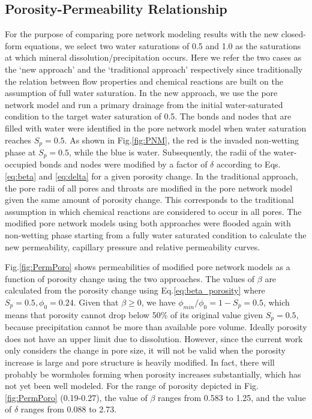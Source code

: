 \documentclass[preprint,12pt,authoryear]{elsarticle}
\begin{document}
\subsection{Porosity-Permeability Relationship}
For the purpose of comparing pore network modeling results with the new closed-form equations, we select two water saturations of 0.5 and 1.0 as the saturations at which mineral dissolution/precipitation occurs. Here we refer the two cases as the `new approach' and the `traditional approach' respectively since traditionally the relation between flow properties and chemical reactions are built on the assumption of full water saturation. In the new approach, we use the pore network model and run a primary drainage from the initial water-saturated condition to the target water saturation of 0.5. The bonds and nodes that are filled with water were identified in the pore network model when water saturation reaches $S_p= 0.5$. As shown in Fig.\ref{fig:PNM}, the red is the invaded non-wetting phase at $S_p=0.5$, while the blue is water. Subsequently, the radii of the water-occupied bonds and nodes were modified by a factor of $\delta$ according to Eqs.\ref{eq:beta} and \ref{eq:delta} for a given porosity change. In the traditional approach, the pore radii of all pores and throats are modified in the pore network model given the same amount of porosity change. This corresponds to the traditional assumption in which chemical reactions are considered to occur in all pores. The modified pore network models using both approaches were flooded again with non-wetting phase starting from a fully water saturated condition to calculate the new permeability, capillary pressure and relative permeability curves. 

Fig.\ref{fig:PermPoro} shows permeabilities of modified pore network models as a function of porosity change using the two approaches. The values of $\beta$ are calculated from the porosity change using Eq.\ref{eq:beta_porosity} where $S_p=0.5, \phi_0=0.24$. Given that $\beta \geq 0$, we have $\phi_{min}/\phi_0=1-S_p=0.5$, which means that porosity cannot drop below 50\% of its original value given $S_p=0.5$, because precipitation cannot be more than available pore volume. Ideally porosity does not have an upper limit due to dissolution. However, since the current work only considers the change in pore size, it will not be valid when the porosity increase is large and pore structure is heavily modified. In fact, there will probably be wormholes forming when porosity increases substantially, which has not yet been well modeled. For the range of porosity depicted in Fig.\ref{fig:PermPoro} (0.19-0.27), the value of $\beta$ ranges from 0.583 to 1.25, and the value of $\delta$ ranges from 0.088 to 2.73. 
\end{document}
